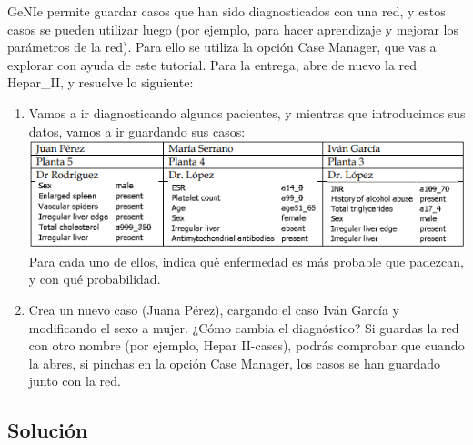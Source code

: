\documentclass{article}
\begin{document}
GeNIe permite guardar casos que han sido diagnosticados con una red, y estos casos se pueden utilizar luego (por ejemplo, para hacer aprendizaje y mejorar los parámetros de la red). Para ello se utiliza la opción Case Manager, que vas a explorar con ayuda de este tutorial.
Para la entrega, abre de nuevo la red Hepar\_II, y resuelve lo siguiente:
\begin{enumerate}[label=\alph*)]
\item Vamos a ir diagnosticando algunos pacientes, y mientras que introducimos sus datos, vamos a ir guardando sus casos:\\
\includegraphics[scale=0.5]{tablaOpcional.png}
\\Para cada uno de ellos, indica qué enfermedad es más probable que padezcan, y con qué probabilidad.
\item Crea un nuevo caso (Juana Pérez), cargando el caso Iván García y modificando el sexo a mujer. ¿Cómo cambia el diagnóstico?
Si guardas la red con otro nombre (por ejemplo, Hepar II-cases), podrás comprobar que cuando la abres, si pinchas en la opción Case Manager, los casos se han guardado junto con la red.
\end{enumerate}

\subsection{Solución}
\end{document}
